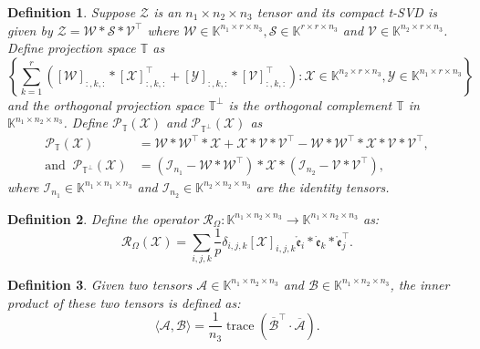 \documentclass[twoside,12pt]{article}
\newtheorem{definition}{Definition}
\def\dme{{\dot{\mathfrak{e}}}}
\def\mrme{{\mathring{\mathfrak{e}}}}
\begin{document}
 \begin{definition} 
Suppose $\mathcal{Z}$ is an $n_1 \times n_2 \times n_3$ tensor and its compact t-SVD is given by $\mathcal{Z}=\mathcal{W} * \mathcal{S} * \mathcal{V}^{\top}$ where $\mathcal{W} \in \mathbb{K}^{n_1 \times r \times n_3}, \mathcal{S} \in \mathbb{K}^{r \times r \times n_3}$ and $\mathcal{V} \in \mathbb{K}^{n_2 \times r \times n_3}$. 
Define projection space $\mathbb{T}$ as
$$
\left\{\sum\limits_{k=1}^{r}([\mathcal{W}]_{:,k,:}*[\mathcal{X}]_{:,k,:}^{\top}+[\mathcal{Y}]_{:,k,:}*[\mathcal{V}]_{:,k,:}^{\top}) : \mathcal{X} \in \mathbb{K}^{n_2\times r\times n_3}, \mathcal{Y} \in \mathbb{K}^{n_1 \times r \times n_3} \right\}
$$ and 
the orthogonal projection space $\mathbb{T}^{\perp}$ is 
the orthogonal complement $\mathbb{T}$ in $\mathbb{K}^{n_1\times n_2 \times n_3}$.
Define $\mathcal{P}_{\mathbb{T}}(\mathcal{X})$ and $\mathcal{P}_{\mathbb{T}^{\perp}}(\mathcal{X})$ as
\begin{align*}  
\mathcal{P}_{\mathbb{T}}(\mathcal{X})&=\mathcal{W} * \mathcal{W}^{\top} * \mathcal{X}+\mathcal{X} * \mathcal{V} * \mathcal{V}^{\top}-\mathcal{W} * \mathcal{W}^{\top} * \mathcal{X} * \mathcal{V} * \mathcal{V}^{\top}, \\ 
\text{and~}~\mathcal{P}_{\mathbb{T}^{\perp}}(\mathcal{X})%
 &=\left(\mathcal{I}_{n_1}-\mathcal{W} * \mathcal{W}^{\top}\right) * \mathcal{X} *\left(\mathcal{I}_{n_2}-\mathcal{V} * \mathcal{V}^{\top}\right),   \end{align*}
where $\mathcal{I}_{n_1}\in\mathbb{K}^{n_1\times n_1\times n_3}$ and $\mathcal{I}_{n_2}\in\mathbb{K}^{n_2\times n_2\times n_3}$  are the identity tensors.
\end{definition}
\begin{definition} 
Define the operator $\mathcal{R}_{\Omega}: \mathbb{K}^{n_1\times n_2 \times n_3}\rightarrow \mathbb{K}^{n_1\times n_2\times n_3}$ as:
$$
\mathcal{R}_{\Omega}(\mathcal{X}) = \sum \limits_{i,j,k}\frac{1}{p}\delta_{i,j,k}[\mathcal{X}]_{i,j,k}\mrme_i * \dme_k * \mrme_j^{\top}.
$$
\end{definition}
\begin{definition}  
Given two tensors $\mathcal{A}\in \mathbb{K}^{n_1\times n_2 \times n_3}$ and $\mathcal{B}\in \mathbb{K}^{n_1\times n_2 \times n_3}$, the inner product of these two tensors is defined as: 
    $$
    \langle\mathcal{A}, \mathcal{B}\rangle=\frac{1}{n_3} \operatorname{trace}\left(\overline{\mathcal{B}}^{\top}\cdot\overline{\mathcal{A}}\right).
    $$
\end{definition}
\end{document}
